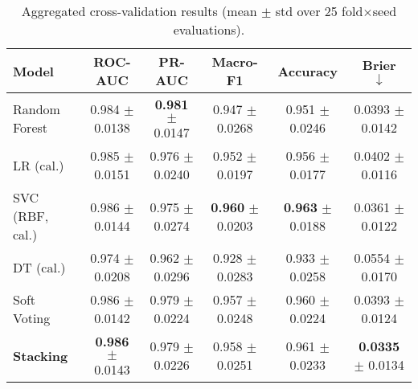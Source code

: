 \documentclass[conference]{IEEEtran}
\begin{document}
\begin{table*}[t]
    \centering
    \small
    \setlength{\tabcolsep}{6pt}
    \caption{Aggregated cross-validation results (mean \(\pm\) std over 25 fold\(\times\)seed evaluations).}
    \label{tab:cv-agg-with-bases}
    \begin{tabular}{lccccc}
    \toprule
    \textbf{Model} & \textbf{ROC-AUC} & \textbf{PR-AUC} & \textbf{Macro-F1} & \textbf{Accuracy} & \textbf{Brier} \(\downarrow\) \\
    \midrule
    Random Forest     & 0.984 \(\pm\) 0.0138 & \textbf{0.981} \(\pm\) 0.0147 & 0.947 \(\pm\) 0.0268 & 0.951 \(\pm\) 0.0246 & 0.0393 \(\pm\) 0.0142 \\
    LR (cal.)         & 0.985 \(\pm\) 0.0151 & 0.976 \(\pm\) 0.0240           & 0.952 \(\pm\) 0.0197 & 0.956 \(\pm\) 0.0177 & 0.0402 \(\pm\) 0.0116 \\
    SVC (RBF, cal.)   & 0.986 \(\pm\) 0.0144 & 0.975 \(\pm\) 0.0274           & \textbf{0.960} \(\pm\) 0.0203 & \textbf{0.963} \(\pm\) 0.0188 & 0.0361 \(\pm\) 0.0122 \\
    DT (cal.)         & 0.974 \(\pm\) 0.0208 & 0.962 \(\pm\) 0.0296           & 0.928 \(\pm\) 0.0283 & 0.933 \(\pm\) 0.0258 & 0.0554 \(\pm\) 0.0170 \\
    Soft Voting       & 0.986 \(\pm\) 0.0142 & 0.979 \(\pm\) 0.0224           & 0.957 \(\pm\) 0.0248 & 0.960 \(\pm\) 0.0224 & 0.0393 \(\pm\) 0.0124 \\
    \textbf{Stacking} & \textbf{0.986} \(\pm\) 0.0143 & 0.979 \(\pm\) 0.0226  & 0.958 \(\pm\) 0.0251 & 0.961 \(\pm\) 0.0233 & \textbf{0.0335} \(\pm\) 0.0134 \\
    \bottomrule
    \end{tabular}
    \end{table*}
\end{document}

